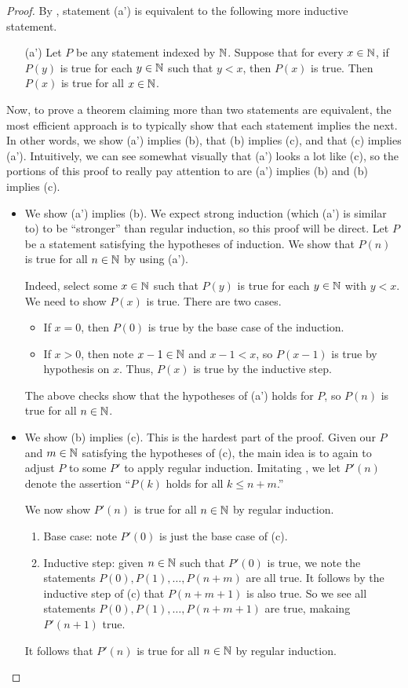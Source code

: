 \documentclass[../main.tex]{subfiles}
\begin{document}
\begin{proof}
    By , statement (a') is equivalent to the following more inductive statement.
    \begin{itemize}
        \item[(a')] Let $P$ be any statement indexed by $\mathbb N$. Suppose that for every $x \in \mathbb N$, if $P(y)$ is true for each $y \in \mathbb N$ such that $y < x$, then $P(x)$ is true. Then $P(x)$ is true for all $x \in \mathbb N$.
    \end{itemize}
    Now, to prove a theorem claiming more than two statements are equivalent, the most efficient approach is to typically show that each statement implies the next. In other words, we show (a') implies (b), that (b) implies (c), and that (c) implies (a'). Intuitively, we can see somewhat visually that (a') looks a lot like (c), so the portions of this proof to really pay attention to are (a') implies (b) and (b) implies (c).
    \begin{itemize}
        \item We show (a') implies (b). We expect strong induction (which (a') is similar to) to be ``stronger'' than regular induction, so this proof will be direct. Let $P$ be a statement satisfying the hypotheses of induction. We show that $P(n)$ is true for all $n\in\mathbb N$ by using (a').

        Indeed, select some $x\in\mathbb N$ such that $P(y)$ is true for each $y\in\mathbb N$ with $y<x$. We need to show $P(x)$ is true. There are two cases.
        \begin{itemize}
            \item If $x=0$, then $P(0)$ is true by the base case of the induction.
            \item If $x>0$, then note $x-1\in\mathbb N$ and $x-1<x$, so $P(x-1)$ is true by hypothesis on $x$. Thus, $P(x)$ is true by the inductive step.
        \end{itemize}
        The above checks show that the hypotheses of (a') holds for $P$, so $P(n)$ is true for all $n\in\mathbb N$.
        
        \item We show (b) implies (c). This is the hardest part of the proof. Given our $P$ and $m\in\mathbb N$ satisfying the hypotheses of (c), the main idea is to again to adjust $P$ to some $P'$ to apply regular induction. Imitating , we let $P'(n)$ denote the assertion ``$P(k)$ holds for all $k\le n+m$.''

        We now show $P'(n)$ is true for all $n\in\mathbb N$ by regular induction.
        \begin{enumerate}
            \item Base case: note $P'(0)$ is just the base case of (c).
            \item Inductive step: given $n\in\mathbb N$ such that $P'(0)$ is true, we note the statements $P(0),P(1),\ldots,P(n+m)$ are all true. It follows by the inductive step of (c) that $P(n+m+1)$ is also true. So we see all statements $P(0),P(1),\ldots,P(n+m+1)$ are true, makaing $P'(n+1)$ true.
        \end{enumerate}
        It follows that $P'(n)$ is true for all $n\in\mathbb N$ by regular induction.


\end{itemize}
\end{proof}
\end{document}
